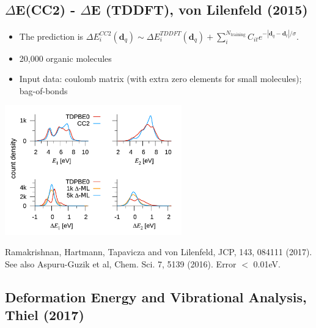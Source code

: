 \documentclass[handout]{beamer} %
\begin{document}
\subsection{$\Delta$E(CC2) - $\Delta$E (TDDFT), von Lilenfeld (2015)}

\begin{frame}

\begin{itemize}
\item \scriptsize{The prediction is} 
$\Delta E^{CC2}_i (\mathbf{d}_q) \sim \Delta E^{TDDFT}_i (\mathbf{d}_q)  + \sum_{i}^{N_{\mathrm{training}}} C_{it} e^{- \left| \mathbf{d}_q - \mathbf{d}_t \right| / \sigma} $. 
\item 20,000 organic molecules
\item Input data: coulomb matrix (with extra zero elements for small molecules); bag-of-bonds  
\end{itemize}
\begin{center}
\includegraphics[height=2.2in]{figures_ml/Lilenfeld_TDDFT_dist.png}
\end{center}
\vspace{-3mm}
\begin{center}
\footnotesize{Ramakrishnan, Hartmann, Tapavicza and von Lilenfeld, JCP, 143, 084111 (2017).}
\footnotesize{See also Aspuru-Guzik et al, Chem. Sci. 7, 5139 (2016).  Error $<$ 0.01eV.} 
\end{center} 
\end{frame}

\subsection{Deformation Energy and Vibrational Analysis, Thiel (2017)}
\end{document}
